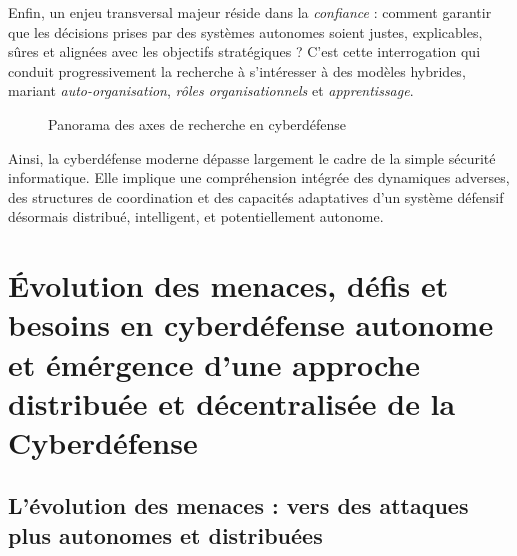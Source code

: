 \documentclass[ twoside,openright,titlepage,numbers=noenddot,headinclude,%
                footinclude=true,cleardoublepage=empty,abstractoff, %
                BCOR=5mm,paper=a4,fontsize=11pt,%
                french,american,%
                ]{scrreprt}
\begin{document}
Enfin, un enjeu transversal majeur réside dans la \textit{confiance} : comment garantir que les décisions prises par des systèmes autonomes soient justes, explicables, sûres et alignées avec les objectifs stratégiques ? C'est cette interrogation qui conduit progressivement la recherche à s'intéresser à des modèles hybrides, mariant \textit{auto-organisation}, \textit{rôles organisationnels} et \textit{apprentissage}.

\begin{figure}[H]
    \centering
    \caption{Panorama des axes de recherche en cyberdéfense}
    \label{fig:panorama-cyberdefense}
\end{figure}

\vspace{0.3cm}
Ainsi, la cyberdéfense moderne dépasse largement le cadre de la simple sécurité informatique. Elle implique une compréhension intégrée des dynamiques adverses, des structures de coordination et des capacités adaptatives d'un système défensif désormais distribué, intelligent, et potentiellement autonome.


\section{Évolution des menaces, défis et besoins en cyberdéfense autonome et émérgence d'une approche distribuée et décentralisée de la Cyberdéfense}\label{sec:evolution-menaces}


\subsection*{L'évolution des menaces : vers des attaques plus autonomes et distribuées}
\end{document}
